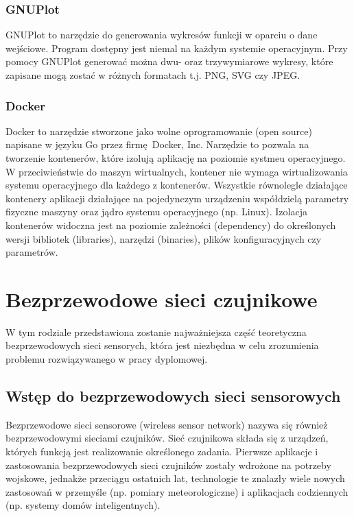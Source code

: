 \documentclass[a4paper,12pt,twoside,openany]{report}
\begin{document}
\subsection{GNUPlot}

GNUPlot to narzędzie do generowania wykresów funkcji w oparciu o dane wejściowe. Program dostępny jest niemal na każdym systemie operacyjnym.
Przy pomocy GNUPlot generować można dwu- oraz trzywymiarowe wykresy, które zapisane mogą zostać w różnych formatach t.j. PNG, SVG czy JPEG.

\subsection{Docker}

Docker to narzędzie stworzone jako wolne oprogramowanie (open source) napisane w języku Go przez firmę Docker, Inc.
Narzędzie to pozwala na tworzenie kontenerów, które izolują aplikację na poziomie systmeu operacyjnego. W przeciwieństwie do maszyn wirtualnych, kontener nie wymaga
wirtualizowania systemu operacyjnego dla każdego z kontenerów. Wszystkie równolegle działające kontenery aplikacji działające na pojedynczym urządzeniu współdzielą
parametry fizyczne maszyny oraz jądro systemu operacyjnego (np. Linux). Izolacja kontenerów widoczna jest na poziomie zależności (dependency) do określonych wersji
bibliotek (libraries), narzędzi (binaries), plików konfiguracyjnych czy parametrów.

\chapter{Bezprzewodowe sieci czujnikowe}

W tym rodziale przedstawiona zostanie najważniejsza część teoretyczna bezprzewodowych sieci sensorych, która jest niezbędna w celu zrozumienia problemu
rozwiązywanego w pracy dyplomowej.

\section{Wstęp do bezprzewodowych sieci sensorowych}
Bezprzewodowe sieci sensorowe (wireless sensor network) nazywa się również bezprzewodowymi sieciami czujników.
Sieć czujnikowa składa się z urządzeń, których funkcją jest realizowanie określonego zadania.
Pierwsze aplikacje i zastosowania bezprzewodowych sieci czujników zostały wdrożone na potrzeby wojskowe, jednakże przeciągu ostatnich lat, technologie te znalazły
wiele nowych zastosowań w przemyśle (np. pomiary meteorologiczne) i aplikacjach codziennych (np. systemy domów inteligentnych).
\end{document}

